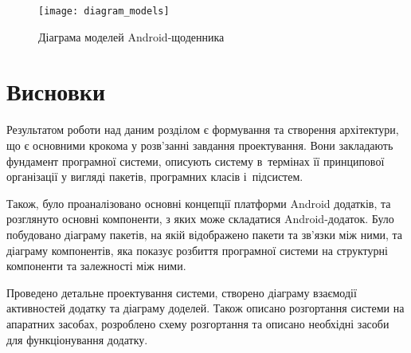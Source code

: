 \documentclass[../main.tex]{subfiles}
\begin{document}
\begin{figure}[pt] %
	\centering
	\texttt{[image: diagram\_models]}
	\caption{Діаграма моделей Android-щоденника}
\end{figure}

\section{Висновки}

Результатом роботи над даним розділом є формування та створення архітектури, що є основними крокома у розв'занні завдання проектування. Вони закладають фундамент програмної системи, описують систему в~термінах її принципової організації у вигляді пакетів, програмних класів і~підсистем.

Також, було проаналізовано основні концепції платформи Android додатків, та розглянуто основні компоненти, з яких може складатися Android-додаток. Було побудовано діаграму пакетів, на якій відображено пакети та зв'язки між ними, та діаграму компонентів, яка показує розбиття програмної системи на структурні компоненти та залежності між ними.

Проведено детальне проектування системи, створено діаграму взаємодії активностей додатку та діаграму доделей. Також описано розгортання системи на апаратних засобах, розроблено схему розгортання та описано необхідні засоби для функціонування додатку.
\end{document}
